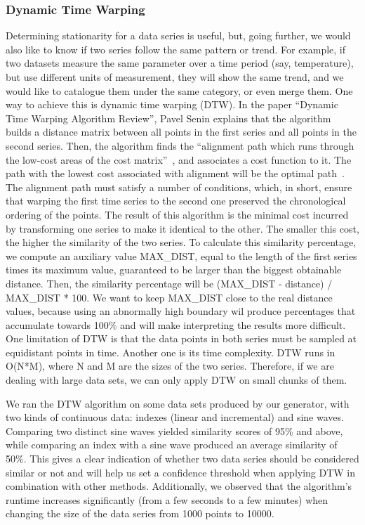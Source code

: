 \bigbreak

\subsubsection{Dynamic Time Warping}
Determining stationarity for a data series is useful, but, going further, we would also like to know if two series follow
the same pattern or trend.
For example, if two datasets measure the same parameter over a time period (say, temperature), but use different units of
measurement, they will show the same trend, and we would like to catalogue them under the same category, or even merge them.
One way to achieve this is dynamic time warping (DTW).
In the paper ``Dynamic Time Warping Algorithm Review'', Pavel Senin explains that the algorithm builds a distance matrix
between all points in the first series and all points in the second series.
Then, the algorithm finds the ``alignment path which runs through the low-cost areas of the cost matrix''~\cite{DTWAlgorithmReview},
and associates a cost function to it.
The path with the lowest cost associated with alignment will be the optimal path~\cite{DTWAlgorithmReview}.
The alignment path must satisfy a number of conditions, which, in short, ensure that warping the first time series to the second one
preserved the chronological ordering of the points.
The result of this algorithm is the minimal cost incurred by transforming one series to make it identical to the other.
The smaller this cost, the higher the similarity of the two series.
To calculate this similarity percentage, we compute an auxiliary value MAX\_DIST, equal to the length of the first series
times its maximum value, guaranteed to be larger than the biggest obtainable distance.
Then, the similarity percentage will be (MAX\_DIST - distance) / MAX\_DIST * 100.
We want to keep MAX\_DIST close to the real distance values, because using an abnormally high boundary wil produce percentages
that accumulate towards 100\% and will make interpreting the results more difficult.
One limitation of DTW is that the data points in both series must be sampled at equidistant points in time.
Another one is its time complexity.
DTW runs in O(N*M), where N and M are the sizes of the two series.
Therefore, if we are dealing with large data sets, we can only apply DTW on small chunks of them.

\bigbreak

We ran the DTW algorithm on some data sets produced by our generator, with two kinds of continuous data: indexes (linear and
incremental) and sine waves.
Comparing two distinct sine waves yielded similarity scores of 95\% and above, while comparing an index with a sine wave produced
an average similarity of 50\%.
This gives a clear indication of whether two data series should be considered similar or not and will help us set a confidence
threshold when applying DTW in combination with other methods.
Additionally, we observed that the algorithm's runtime increases significantly (from a few seconds to a few minutes) when
changing the size of the data series from 1000 points to 10000.
